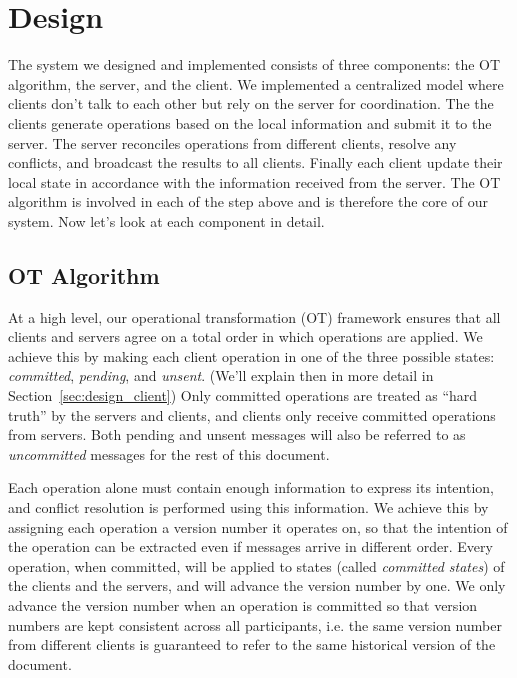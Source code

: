 \section{Design}

The system we designed and implemented consists of three components: the OT
algorithm, the server, and the client. We implemented a centralized model where
clients don't talk to each other but rely on the server for coordination. The
the clients generate operations based on the local information and submit it to
the server. The server reconciles operations from different clients, resolve any
conflicts, and broadcast the results to all clients. Finally each client update
their local state in accordance with the information received from the server.
The OT algorithm is involved in each of the step above and is therefore the core
of our system. Now let's look at each component in detail.

\subsection{OT Algorithm}
\label{sec:design_alg}

At a high level, our operational transformation (OT) framework ensures that all
clients and servers agree on a total order in which operations are applied. We
achieve this by making each client operation in one of the three possible
states: {\em committed}, {\em pending}, and {\em unsent}. (We'll explain then in
more detail in Section~\ref{sec:design_client}) Only committed operations are
treated as ``hard truth'' by the servers and clients, and clients only receive
committed operations from servers. Both pending and unsent messages will also be
referred to as {\em uncommitted} messages for the rest of this document.

Each operation alone must contain enough information to express its intention,
and conflict resolution is performed using this information. We achieve this by
assigning each operation a version number it operates on, so that the intention
of the operation can be extracted even if messages arrive in different order.
Every operation, when committed, will be applied to states (called {\em
committed states}) of the clients and the servers, and will advance the version
number by one. We only advance the version number when an operation is committed
so that version numbers are kept consistent across all participants, i.e. the
same version number from different clients is guaranteed to refer to the same
historical version of the document.

